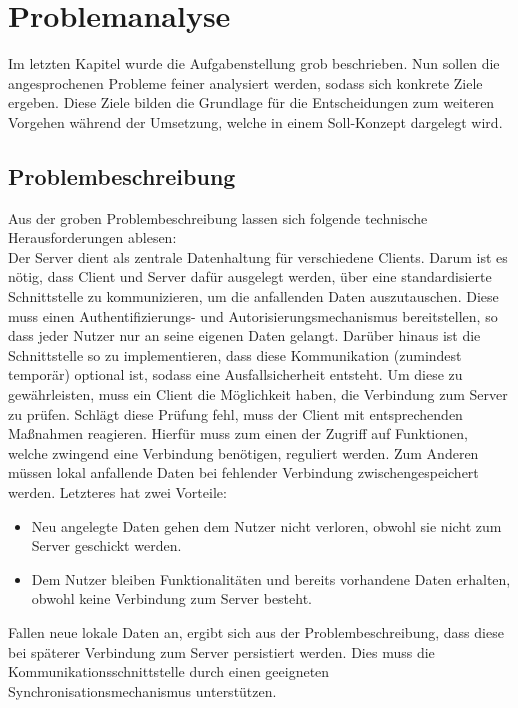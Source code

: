 \chapter{Problemanalyse}
\label{cha:problemanalyse}
Im letzten Kapitel wurde die Aufgabenstellung grob beschrieben. Nun sollen die angesprochenen Probleme feiner analysiert werden, sodass sich konkrete Ziele ergeben. Diese Ziele bilden die Grundlage für die Entscheidungen zum weiteren Vorgehen während der Umsetzung, welche in einem Soll-Konzept dargelegt wird.
\section{Problembeschreibung}
\label{sec:problembeschreibung}
Aus der groben Problembeschreibung lassen sich folgende technische Herausforderungen ablesen:\\
Der Server dient als zentrale Datenhaltung für verschiedene Clients. Darum ist es nötig, dass Client und Server dafür ausgelegt werden, über eine standardisierte Schnittstelle zu kommunizieren, um die anfallenden Daten auszutauschen. Diese muss einen Authentifizierungs- und Autorisierungsmechanismus bereitstellen, so dass jeder Nutzer nur an seine eigenen Daten gelangt. Darüber hinaus ist die Schnittstelle so zu implementieren, dass diese Kommunikation (zumindest temporär) optional ist, sodass eine Ausfallsicherheit entsteht. Um diese zu gewährleisten, muss ein Client die Möglichkeit haben, die Verbindung zum Server zu prüfen. Schlägt diese Prüfung fehl, muss der Client mit entsprechenden Maßnahmen reagieren. Hierfür muss zum einen der Zugriff auf Funktionen, welche zwingend eine Verbindung benötigen, reguliert werden. Zum Anderen müssen lokal anfallende Daten bei fehlender Verbindung zwischengespeichert werden. Letzteres hat zwei Vorteile:
\begin{itemize}
\item Neu angelegte Daten gehen dem Nutzer nicht verloren, obwohl sie nicht zum Server geschickt werden.
\item Dem Nutzer bleiben Funktionalitäten und bereits vorhandene Daten erhalten, obwohl keine Verbindung zum Server besteht.
\end{itemize}
Fallen neue lokale Daten an, ergibt sich aus der Problembeschreibung, dass diese bei späterer Verbindung zum Server persistiert werden. Dies muss die Kommunikationsschnittstelle durch einen geeigneten Synchronisationsmechanismus unterstützen. 

